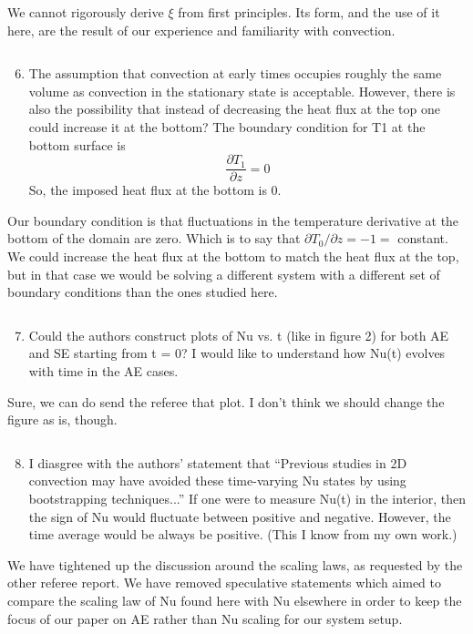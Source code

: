 \documentclass[aps, 11pt, singlecolumn]{revtex4-1} %
\begin{document}
\begin{singlespace}
We cannot rigorously derive $\xi$ from first principles. Its form, and the use of
it here, are the result of our experience and familiarity with convection. 

\begin{myquotation}
$\,$\\\vspace{-1.25cm}
\begin{enumerate}
\setcounter{enumi}{5}
\item The assumption that convection at early times occupies roughly the same volume as convection in the stationary state is acceptable. However, there is also the possibility that instead of decreasing the heat flux at the top one could increase it at the bottom? The boundary condition for T1 at the bottom surface is
$$
\frac{\partial T_1}{\partial z} = 0
$$
So, the imposed heat flux at the bottom is 0.
\end{enumerate}
\end{myquotation}
Our boundary condition is that fluctuations in the temperature derivative at the
bottom of the domain are zero. Which is to say that 
$\partial T_0 / \partial z = -1 =$ constant. We could increase the heat flux at
the bottom to match the heat flux at the top, but in that case we would be solving
a different system with a different set of boundary conditions than the ones
studied here. 

\begin{myquotation}
$\,$\\\vspace{-1.25cm}
\begin{enumerate}
\setcounter{enumi}{6}
\item Could the authors construct plots of Nu vs. t (like in figure 2) for both AE and SE starting from t = 0? I would like to understand how Nu(t) evolves with time in the AE cases.
\end{enumerate}
\end{myquotation}
Sure, we can do send the referee that plot. I don't think we should change the 
figure as is, though.
\begin{myquotation}
$\,$\\\vspace{-1.25cm}
\begin{enumerate}
\setcounter{enumi}{7}
\item I diasgree with the authors’ statement that “Previous studies in 2D convection may have avoided these time-varying Nu states by using bootstrapping techniques...” If one were to measure Nu(t) in the interior, then the sign of Nu would fluctuate between positive and negative. However, the time average would be always be positive. (This I know from my own work.)
\end{enumerate}
\end{myquotation}
We have tightened up the discussion around the scaling laws, as requested by the
other referee report. We have removed speculative statements which aimed to
compare the scaling law of Nu found here with Nu elsewhere in order to keep
the focus of our paper on AE rather than Nu scaling for our system setup.


\end{singlespace}
\end{document}
